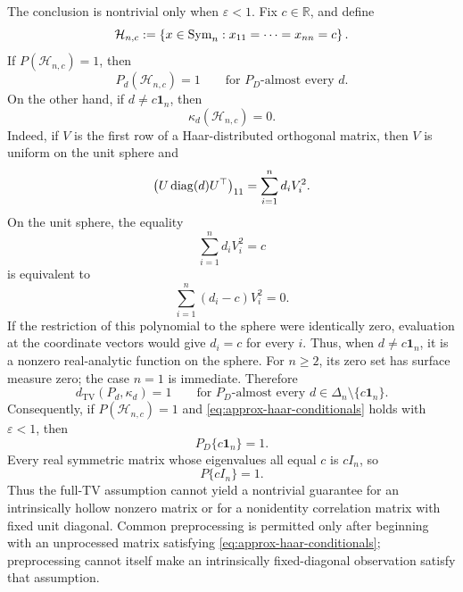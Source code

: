\begin{remark}
\label{srem:fixeddiag}
The conclusion is nontrivial only when \(\varepsilon<1\). Fix
\(c\in\mathbb R\), and define
\[
\mathcal H_{n,c}
:=
\left\{
x\in\mathrm{Sym}_n:
x_{11}=\cdots=x_{nn}=c
\right\}.
\]
If \(P(\mathcal H_{n,c})=1\), then
\[
P_d(\mathcal H_{n,c})=1
\qquad
\text{for \(P_D\)-almost every \(d\)}.
\]
On the other hand, if \(d\neq c\mathbf 1_n\), then
\[
\kappa_d(\mathcal H_{n,c})=0.
\]
Indeed, if \(V\) is the first row of a Haar-distributed orthogonal
matrix, then \(V\) is uniform on the unit sphere and
\[
\left(U\operatorname{diag}(d)U^\top\right)_{11}
=
\sum_{i=1}^{n}d_iV_i^2.
\]
On the unit sphere, the equality
\[
\sum_{i=1}^{n}d_iV_i^2=c
\]
is equivalent to
\[
\sum_{i=1}^{n}(d_i-c)V_i^2=0.
\]
If the restriction of this polynomial to the sphere were identically
zero, evaluation at the coordinate vectors would give
\(d_i=c\) for every \(i\). Thus, when \(d\neq c\mathbf 1_n\), it is a
nonzero real-analytic function on the sphere. For \(n\geq2\), its zero
set has surface measure zero; the case \(n=1\) is immediate.
Therefore
\[
d_{\mathrm{TV}}(P_d,\kappa_d)=1
\qquad
\text{for \(P_D\)-almost every }
d\in\Delta_n\setminus\{c\mathbf 1_n\}.
\]
Consequently, if \(P(\mathcal H_{n,c})=1\) and
\eqref{eq:approx-haar-conditionals} holds with \(\varepsilon<1\), then
\[
P_D\{c\mathbf 1_n\}=1.
\]
Every real symmetric matrix whose eigenvalues all equal \(c\) is
\(cI_n\), so
\[
P\{cI_n\}=1.
\]
Thus the full-TV assumption cannot yield a nontrivial guarantee for
an intrinsically hollow nonzero matrix or for a nonidentity
correlation matrix with fixed unit diagonal. Common preprocessing is
permitted only after beginning with an unprocessed matrix satisfying
\eqref{eq:approx-haar-conditionals}; preprocessing cannot itself make
an intrinsically fixed-diagonal observation satisfy that assumption.
\end{remark}
